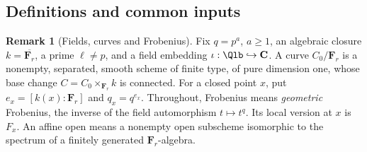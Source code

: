\documentclass[11pt]{article}
\theoremstyle{plain}
\theoremstyle{definition}
\newtheorem{remark}[theorem]{Remark}
\newcommand{\Fq}{\mathbf F_{r}}
\begin{document}
\subsection{Definitions and common inputs}

\begin{remark}[Fields, curves and Frobenius]\label{d:real-setup}
Fix $q=p^a$, $a\ge1$, an algebraic closure $k=\overline{\Fq}$, a prime
$\ell\ne p$, and a field embedding $\iota:\Qlb\hookrightarrow\mathbf C$.
A curve $C_0/\Fq$ is a nonempty, separated, smooth scheme of finite type,
of pure dimension one, whose base change $C=C_0\times_{\Fq}k$ is connected.
For a closed point $x$, put $e_x=[k(x):\Fq]$ and $q_x=q^{e_x}$.
Throughout, Frobenius means \emph{geometric} Frobenius, the inverse of
the field automorphism $t\mapsto t^q$. Its local version at $x$ is $F_x$.
An affine open means a nonempty open subscheme isomorphic to the spectrum
of a finitely generated $\Fq$-algebra.
\end{remark}
\end{document}
